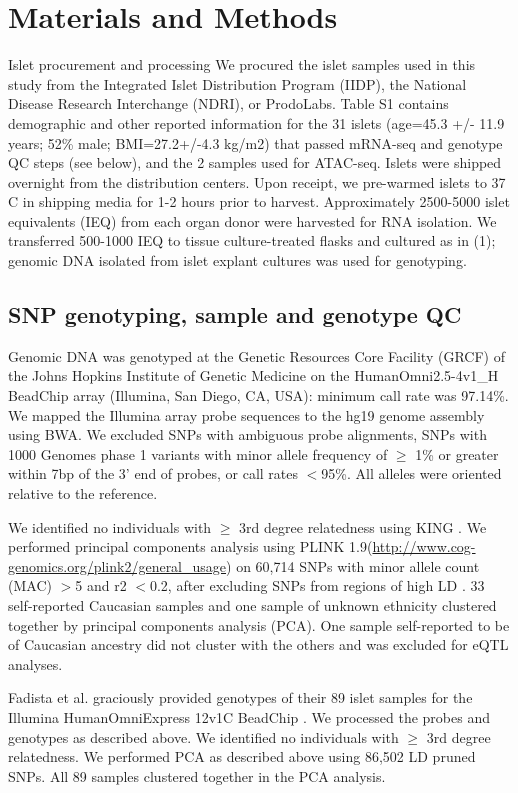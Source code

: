 \section{Materials and Methods}
Islet procurement and processing 
We procured the islet samples used in this study from the Integrated Islet Distribution Program (IIDP), the National Disease Research Interchange (NDRI), or ProdoLabs.  Table S1 contains demographic and other reported information for the 31 islets (age=45.3 +/- 11.9 years; 52\% male; BMI=27.2+/-4.3 kg/m2) that passed mRNA-seq and genotype QC steps (see below), and the 2 samples used for ATAC-seq. Islets were shipped overnight from the distribution centers.  Upon receipt, we pre-warmed islets to 37 C in shipping media for 1-2 hours prior to harvest.  Approximately 2500-5000 islet equivalents (IEQ) from each organ donor were harvested for RNA isolation. We transferred 500-1000 IEQ to tissue culture-treated flasks and cultured as in (1); genomic DNA isolated from islet explant cultures was used for genotyping.

\subsection{SNP genotyping, sample and genotype QC} 
Genomic DNA was genotyped at the Genetic Resources Core Facility (GRCF) of the Johns Hopkins Institute of Genetic Medicine on the HumanOmni2.5-4v1\_H BeadChip array (Illumina, San Diego, CA, USA): minimum call rate was 97.14\%. We mapped the Illumina array probe sequences to the hg19 genome assembly using BWA. We excluded SNPs with ambiguous probe alignments, SNPs with 1000 Genomes phase 1 variants with minor allele frequency of $\geq$ 1\% or greater within 7bp of the 3' end of probes, or call rates $<$95\%. All alleles were oriented relative to the reference. 

We identified no individuals with $\geq$ 3rd degree relatedness using KING \cite{manichaikulRobustRelationshipInference2010}. We performed principal components analysis using PLINK 1.9(\url{http://www.cog-genomics.org/plink2/general\_usage}) on 60,714 SNPs with minor allele count (MAC) $>$5 and r2 $<$0.2, after excluding SNPs from regions of high LD \cite{priceLongRangeLDCan2008}. 33 self-reported Caucasian samples and one sample of unknown ethnicity clustered together by principal components analysis (PCA). One sample self-reported to be of Caucasian ancestry did not cluster with the others and was excluded for eQTL analyses. 

Fadista et al. graciously provided genotypes of their 89 islet samples for the Illumina HumanOmniExpress 12v1C BeadChip \cite{fadistaGlobalGenomicTranscriptomic2014}. We processed the probes and genotypes as described above.  We identified no individuals with $\geq$ 3rd degree relatedness. We performed PCA as described above using 86,502 LD pruned SNPs. All 89 samples clustered together in the PCA analysis.

